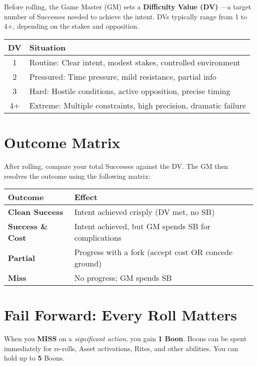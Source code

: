 Before rolling, the Game Master (GM) sets a \textbf{Difficulty Value (DV)} —a target number of Successes needed to achieve the intent. DVs typically range from 1 to 4+, depending on the stakes and opposition.

\begin{center}
\begin{tabular}{cl}
\toprule
\textbf{DV} & \textbf{Situation} \\
\midrule
1 & Routine: Clear intent, modest stakes, controlled environment \\
2 & Pressured: Time pressure, mild resistance, partial info \\
3 & Hard: Hostile conditions, active opposition, precise timing \\
4+ & Extreme: Multiple constraints, high precision, dramatic failure \\
\bottomrule
\end{tabular}
\end{center}

\section{Outcome Matrix}

After rolling, compare your total Successes against the DV. The GM then resolves the outcome using the following matrix:

\begin{center}
\begin{tabular}{ll}
\toprule
\textbf{Outcome} & \textbf{Effect} \\
\midrule
\textbf{Clean Success} & Intent achieved crisply (DV met, no SB) \\
\textbf{Success \& Cost} & Intent achieved, but GM spends SB for complications \\
\textbf{Partial} & Progress with a fork (accept cost OR concede ground) \\
\textbf{Miss} & No progress; GM spends SB \\
\bottomrule
\end{tabular}
\end{center}

\section{Fail Forward: Every Roll Matters}

When you \textbf{MISS} on a \emph{significant action}, you gain \textbf{1 Boon}. Boons can be spent immediately for re-rolls, Asset activations, Rites, and other abilities. You can hold up to \textbf{5} Boons.

